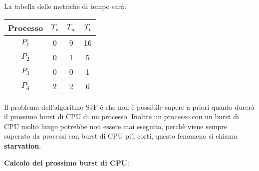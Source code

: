 \documentclass[a4paper]{article}
\begin{document}
\begin{example}
  \vspace{1em}
  \noindent
  La tabella delle metriche di tempo sarà:
  \begin{table}[H]
    \centering
    \begin{tabular}{c|c|c|c}
      Processo & \( T_r \) & \( T_w \) & \( T_t \) \\
      \hline
      \( P_1 \) & 0 & 9 & 16 \\
      \( P_2 \) & 0 & 1 & 5 \\
      \( P_3 \) & 0 & 0 & 1 \\
      \( P_4 \) & 2 & 2 & 6 \\
    \end{tabular}
  \end{table}
\end{example}

\noindent
Il problema dell'algoritmo SJF è che non è possibile sapere a priori quanto durerà
il prossimo burst di CPU di un processo. Inoltre un processo con un burst di CPU
molto lungo potrebbe non essere mai eseguito, perchè viene sempre superato da processi
con burst di CPU più corti, questo fenomeno si chiama \textbf{starvation}.

\vspace{1em}
\noindent
\textbf{Calcolo del prossimo burst di CPU}:
\end{document}
